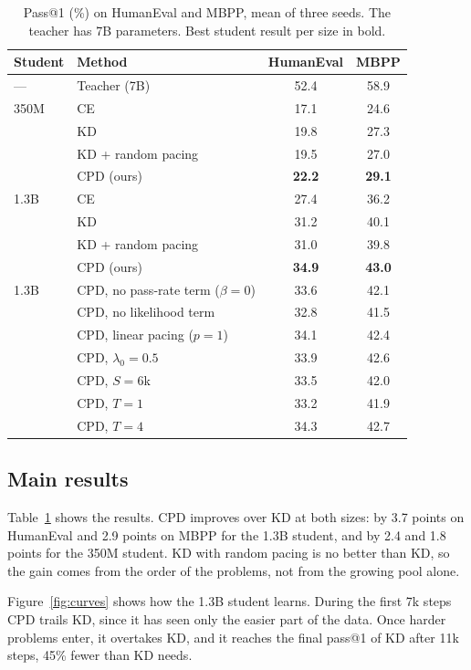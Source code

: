 \documentclass{article} %
\begin{document}
\begin{table}[t]
\caption{Pass@1 (\%) on HumanEval and MBPP, mean of three seeds. The teacher has 7B parameters. Best student result per size in bold.}
\label{tab:main}
\centering
\begin{tabular}{llcc}
\toprule
Student & Method & HumanEval & MBPP \\
\midrule
--- & Teacher (7B) & 52.4 & 58.9 \\
\midrule
350M & CE & 17.1 & 24.6 \\
 & KD & 19.8 & 27.3 \\
 & KD + random pacing & 19.5 & 27.0 \\
 & CPD (ours) & \textbf{22.2} & \textbf{29.1} \\
\midrule
1.3B & CE & 27.4 & 36.2 \\
 & KD & 31.2 & 40.1 \\
 & KD + random pacing & 31.0 & 39.8 \\
 & CPD (ours) & \textbf{34.9} & \textbf{43.0} \\
\midrule
1.3B & CPD, no pass-rate term ($\beta = 0$) & 33.6 & 42.1 \\
 & CPD, no likelihood term & 32.8 & 41.5 \\
 & CPD, linear pacing ($p = 1$) & 34.1 & 42.4 \\
 & CPD, $\lambda_0 = 0.5$ & 33.9 & 42.6 \\
 & CPD, $S = 6$k & 33.5 & 42.0 \\
 & CPD, $T = 1$ & 33.2 & 41.9 \\
 & CPD, $T = 4$ & 34.3 & 42.7 \\
\bottomrule
\end{tabular}
\end{table}

\subsection{Main results}

Table~\ref{tab:main} shows the results.
CPD improves over KD at both sizes: by 3.7 points on HumanEval and 2.9 points on MBPP for the 1.3B student, and by 2.4 and 1.8 points for the 350M student.
KD with random pacing is no better than KD, so the gain comes from the order of the problems, not from the growing pool alone.

Figure~\ref{fig:curves} shows how the 1.3B student learns.
During the first 7k steps CPD trails KD, since it has seen only the easier part of the data.
Once harder problems enter, it overtakes KD, and it reaches the final pass@1 of KD after 11k steps, 45\% fewer than KD needs.
\end{document}
